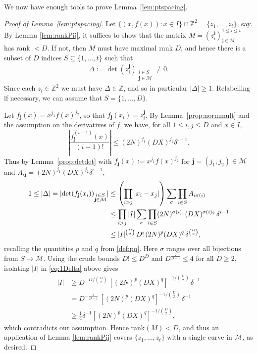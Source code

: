 \documentclass[12pt]{amsart}
\newcommand{\Z}{{\mathbb Z}}
\newcommand{\1}{{\mathbf 1}}
\theoremstyle{remark}
\theoremstyle{definition}
\begin{document}
We now have enough tools to prove Lemma~\ref{lem:ptspacing}.
\begin{proof}[Proof of Lemma~\ref{lem:ptspacing}]
Let $\{(x,f(x)) : x\in I\}\cap \Z^2=\{z_1,\ldots,z_t\}$, say. By Lemma \ref{lem:rankPij}, it suffices to show that the matrix $M=(z_i^\mathbf{j})_{\mathbf{j}\in \mathcal{M}}^{1\le i\le t}$ has rank $<D$. If not, then $M$ must have maximal rank $D$, and hence there is a subset of $D$ indices $S\subseteq \{1,\ldots,t\}$ such that
\begin{align}
\Delta := \det(z_i^\mathbf{j})_{\substack{i\in S\\\mathbf{j}\in \mathcal{M}}} \neq 0.
\end{align}
Since each $z_i\in \mathbb{Z}^2$ we must have $\Delta\in \Z$, and so in particular $|\Delta|\ge1$. Relabelling if necessary, we can assume that $S=\{1,\ldots,D\}$. 

Let $f_\mathbf{j}(x)=x^{j_1}f(x)^{j_2}$, so that $f_\mathbf{j}(x_i)=z_i^\mathbf{j}$. By Lemma~\ref{prop:normmult} and the assumption on the derivatives of $f$, we have, for all $1\leq i,j\leq D$ and $x\in I$,
\[\left\lvert \frac{f_\mathbf{j}^{(i-1)}(x)}{(i-1)!}\right\rvert\leq (2N)^{j_1}(DX)^{j_2}\delta^{i-1}.\]
Thus by Lemma~\ref{prop:detdet} with $f_\mathbf{j}(x) := x^{j_1}f(x)^{j_2}$ for $\mathbf{j}=(j_1,j_2)\in \mathcal M$ and $A_{i\mathbf{j}}=(2N)^{j_1}(DX)^{j_2}\delta^{i-1}$,
\begin{align}\label{eq:1Delta}
1\le |\Delta| = \lvert\det(f_\mathbf{j}(x_i))_{\substack{i\in S\\\mathbf{j}\in \mathcal{M}}}\rvert
&\le  \left(\prod_{i> j}\abs{x_i-x_j}\right)\sum_{\sigma} \prod_{i\in S}A_{i\sigma(i)} \nonumber\\
&\le  \prod_{i> j}|I|\sum_{\sigma} \prod_{i\in S}(2N)^{\sigma(i)_1}(DX)^{\sigma(i)_2}\,\delta^{i-1} \nonumber\\
& \le  \lvert I\rvert^{\binom{D}{2}}\, D!\,(2N)^p(DX)^q\, \delta^{\binom{D}{2}},
\end{align}
recalling the quantities $p$ and $q$ from \eqref{def:pq}. Here $\sigma$ ranges over all bijections from $S\to \mathcal{M}$. Using the crude bounds $D!\leq D^D$ and $D^{\frac{2}{D-1}}\leq 4$ for all $D\ge2$, isolating $|I|$ in \eqref{eq:1Delta} above gives
\begin{align*}
\lvert I\rvert & \ge D^{-D/\binom{D}{2}}\,[(2N)^p(DX)^q]^{-1/\binom{D}{2}}\, \delta^{-1}\\
&= D^{-\frac{2}{D-1}}\,[(2N)^p(DX)^q]^{-1/\binom{D}{2}}\, \delta^{-1}\\
& \ge\tfrac{1}{4}\delta^{-1}[(2N)^p(DX)^q]^{-1/\binom{D}{2}},
\end{align*}
which contradicts our assumption. Hence rank$(M)<D$, and thus an application of Lemma \ref{lem:rankPij} covers $\{z_1,\ldots,z_t\}$ with a single curve in $\mathcal M$, as desired.
\end{proof}
\end{document}

